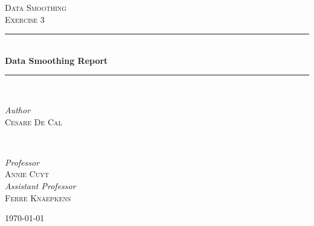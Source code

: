 \documentclass{article}
\begin{document}

\begin{titlepage} %
	\newcommand{\HRule}{\rule{\linewidth}{0.5mm}}%
	
	\center %
	
	
	\textsc{\Large Data Smoothing}\\[0.5cm] %
	
	\textsc{\large Exercise 3}\\[0.5cm] %
	
	
	\HRule\\[0.6cm]
	
	{\huge\bfseries Data Smoothing Report}\\[0.25cm] %
	
	\HRule\\[1.5cm]
	
	
	\begin{minipage}{0.4\textwidth}
		\begin{flushleft}
			\large
			\textit{Author}\\
			\textsc{Cesare De Cal} %
		\end{flushleft}
	\end{minipage}
	~
	\begin{minipage}{0.4\textwidth}
		\begin{flushright}
			\large
			\textit{Professor}\\
			\textsc{Annie Cuyt}\\ %
			[0.25cm]
			\textit{Assistant Professor}\\
			\textsc{Ferre Knaepkens} %

		\end{flushright}
	\end{minipage}
		
	\vfill\vfill\vfill
	
	{\large\today}
		
	\vfill
	
\end{titlepage}
\end{document}
